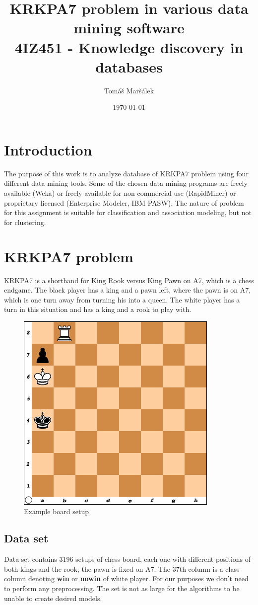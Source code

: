 \documentclass[11pt]{article}
\title{KRKPA7 problem in various data mining software \\ 4IZ451 - Knowledge discovery in databases}
\author{Tomáš Maršálek}
\date{\today}
\begin{document}
\maketitle
\thispagestyle{empty}
\clearpage

\section{Introduction}
The purpose of this work is to analyze database of KRKPA7 problem using four different data mining tools. Some of the chosen data mining programs are freely available (Weka) or freely available for non-commercial use (RapidMiner) or proprietary licensed (Enterprise Modeler, IBM PASW). %
The nature of problem for this assignment is suitable for classification and association modeling, but not for clustering.

\section{KRKPA7 problem}
KRKPA7 is a shorthand for King Rook versus King Pawn on A7, which is a chess endgame. The black player has a king and a pawn left, where the pawn is on A7, which is one turn away from turning his into a queen. The white player has a turn in this situation and has a king and a rook to play with.

\begin{figure}[!ht]
	\centering
	\includegraphics[width=.7\textwidth]{example}
	\caption{Example board setup}
\end{figure}

\clearpage

\subsection{Data set}
Data set contains 3196 setups of chess board, each one with different positions
of both kings and the rook, the pawn is fixed on A7. The 37th column is a class
column denoting {\bf win} or {\bf nowin} of white player. For our purposes we
don't need to perform any preprocessing. The set is not as large for the
algorithms to be unable to create desired models.
\end{document}
